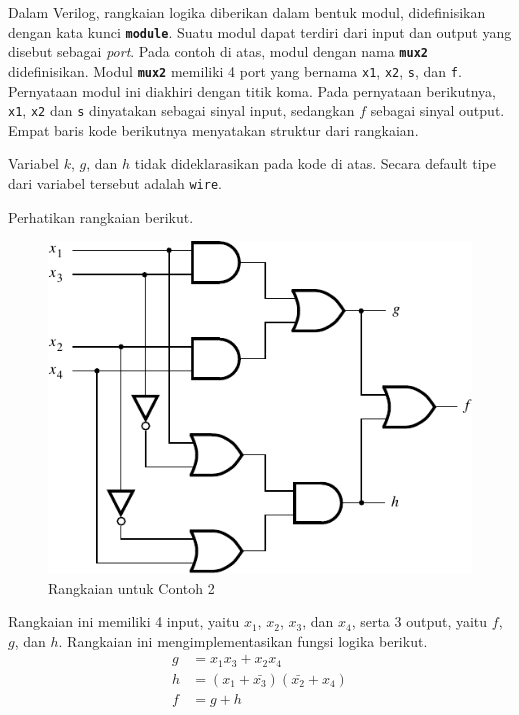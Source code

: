 Dalam Verilog, rangkaian logika diberikan dalam bentuk modul, didefinisikan
dengan
kata kunci {\tt \textbf{module}}. Suatu modul dapat terdiri dari input dan
output yang disebut sebagai \textit{port}.
Pada contoh di atas, modul dengan nama {\tt \textbf{mux2}} didefinisikan.
Modul {\tt \textbf{mux2}} memiliki 4 port yang bernama {\tt x1}, {\tt x2},
{\tt s}, dan {\tt f}. Pernyataan modul ini diakhiri dengan titik koma.
Pada pernyataan berikutnya, {\tt x1}, {\tt x2} dan {\tt s} dinyatakan
sebagai sinyal input, sedangkan $f$ sebagai sinyal output. Empat baris kode
berikutnya menyatakan struktur dari rangkaian.

Variabel $k$, $g$, dan $h$ tidak dideklarasikan pada kode di atas. Secara default
tipe dari variabel tersebut adalah {\tt wire}.

 Perhatikan rangkaian berikut.

\begin{figure}[H]
\centering
\includegraphics[scale=1.0]{images/fig_2_39.pdf}
\par
\caption{Rangkaian untuk Contoh 2}\label{fig:Contoh2}
\end{figure}

Rangkaian ini memiliki 4 input, yaitu $x_1$, $x_2$, $x_3$, dan
$x_4$, serta 3 output, yaitu $f$, $g$, dan $h$.
Rangkaian ini mengimplementasikan fungsi logika berikut.
\begin{align*}
g & = x_1 x_3 + x_2 x_4 \\
h & = (x_1 + \bar{x_3})(\bar{x_2} + x_4) \\
f & = g + h
\end{align*}

